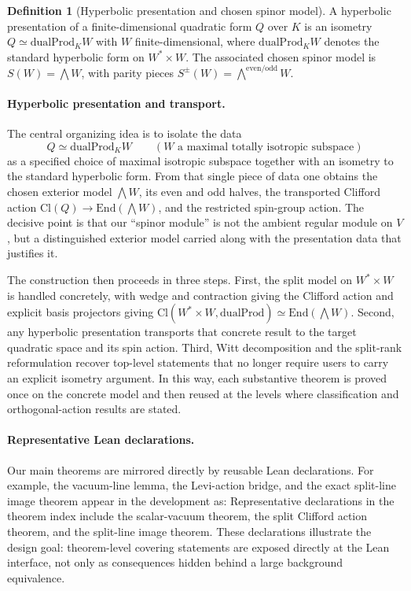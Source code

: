 \documentclass{birkjour}
\theoremstyle{plain}
\theoremstyle{definition}
\newtheorem{definition}[theorem]{Definition}
\theoremstyle{remark}
\newcommand{\Cl}{\mathrm{Cl}}
\newcommand{\End}{\mathrm{End}}
\newcommand{\dualProd}{\mathrm{dualProd}}
\begin{document}
\begin{definition}[Hyperbolic presentation and chosen spinor model]
A hyperbolic presentation of a finite-dimensional quadratic form $Q$ over $K$
is an isometry $Q \simeq \dualProd_K W$ with $W$ finite-dimensional, where
$\dualProd_K W$ denotes the standard hyperbolic form on $W^* \times W$. The
associated chosen spinor model is $S(W)=\bigwedge W$, with parity pieces
$S^\pm(W)=\bigwedge^{\mathrm{even}/\mathrm{odd}} W$.
\end{definition}

\paragraph{Hyperbolic presentation and transport.} The central organizing idea is
to isolate the data
\[
  Q \simeq \dualProd_K W
  \qquad (W \text{ a maximal totally isotropic subspace})
\]
as a specified choice of maximal isotropic subspace together with an isometry to
the standard hyperbolic form. From that single piece of data one obtains the
chosen exterior model $\bigwedge W$, its even and odd halves, the transported
Clifford action $\Cl(Q)\to\End(\bigwedge W)$, and the restricted spin-group
action. The decisive point is that our ``spinor module'' is not the
ambient regular module on $V$, but a distinguished exterior model carried along
with the presentation data that justifies it.

The construction then proceeds in three steps. First, the split model on
$W^* \times W$ is handled concretely, with wedge and contraction giving the
Clifford action and explicit basis projectors giving
$\Cl(W^* \times W,\dualProd)\simeq\End(\bigwedge W)$. Second, any hyperbolic
presentation transports that concrete result to the target quadratic space and
its spin action. Third, Witt decomposition and the split-rank reformulation recover
top-level statements that no longer require users to carry an explicit isometry
argument. In this way, each substantive theorem is proved once on the concrete
model and then reused at the levels where classification and orthogonal-action
results are stated.

\paragraph{Representative Lean declarations.}
Our main theorems are mirrored directly by reusable Lean declarations.
For example, the vacuum-line lemma, the Levi-action bridge, and the exact
split-line image theorem appear in the development as:
Representative declarations in the theorem index include the scalar-vacuum
theorem, the split Clifford action theorem, and the split-line image theorem.
These declarations illustrate the design goal: theorem-level covering
statements are exposed directly at the Lean interface, not only as
consequences hidden behind a large background equivalence.
\end{document}
